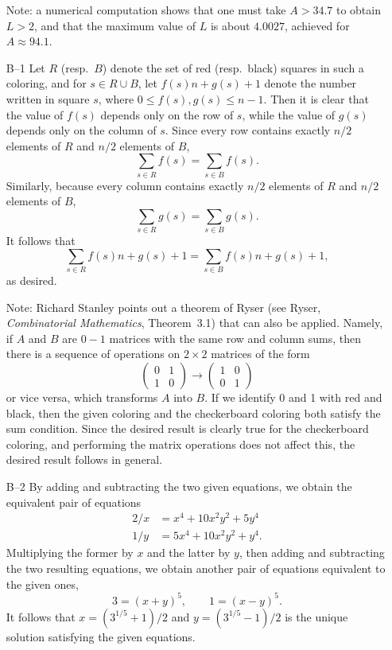 \documentclass[amssymb,twocolumn,pra,10pt,aps]{revtex4-1}
\begin{document}
\begin{itemize}
Note: a numerical computation shows that one must take $A > 34.7$ to
obtain $L > 2$, and that the maximum value of $L$ is about
$4.0027$, achieved for $A \approx 94.1$.

\item[B--1]
Let $R$ (resp.\ $B$) denote the set of red (resp.\ black) squares in
such a coloring, and for $s\in R\cup B$, let $f(s)n+g(s)+1$ denote the
number written in square $s$, where $0\leq f(s),g(s)\leq n-1$.
Then it is clear that the value of $f(s)$ depends only on the row of
$s$, while the value of $g(s)$ depends only on the column of $s$.  Since
every row contains exactly $n/2$ elements of $R$ and $n/2$ elements of $B$,
\[ \sum_{s\in R} f(s) = \sum_{s\in B} f(s) .\]
Similarly, because every column contains exactly $n/2$ elements of $R$ and
$n/2$ elements of $B$,
\[ \sum_{s\in R} g(s) = \sum_{s\in B} g(s) .\]
It follows that
\[\sum_{s\in R} f(s)n+g(s)+1 = \sum_{s\in B} f(s)n+g(s)+1,\]
as desired.

Note: Richard Stanley points out a theorem of Ryser (see Ryser,
\textit{Combinatorial Mathematics}, Theorem~3.1) that can also be applied.
Namely, if $A$ and $B$ are $0-1$ matrices with the same row and column
sums, then there is a sequence of operations on $2 \times 2$ matrices
of the form
\[
\begin{pmatrix} 0 & 1 \\ 1 & 0 \end{pmatrix} \to
\begin{pmatrix} 1 & 0 \\ 0 & 1 \end{pmatrix}
\]
or vice versa, which transforms $A$ into $B$. If we identify 0 and 1 with
red and black, then the given coloring and the checkerboard coloring
both satisfy the sum condition. Since the desired result is clearly
true for the checkerboard coloring, and performing the matrix operations
does not affect this, the desired result follows in general.

\item[B--2]
By adding and subtracting the two given equations, we obtain
the equivalent pair of equations
\begin{align*}
2/x &= x^4 + 10x^2y^2 + 5y^4 \\
1/y &= 5x^4 + 10x^2y^2 + y^4.
\end{align*}
Multiplying the former by
$x$ and the latter by $y$, then adding and subtracting the two
resulting equations, we obtain another pair of equations equivalent
to the given ones,
\[
3 = (x+y)^5, \qquad 1 = (x-y)^5.
\]
It follows that
$x = (3^{1/5}+1)/2$ and $y = (3^{1/5}-1)/2$ is the unique solution
satisfying the given equations.


\end{itemize}
\end{document}
